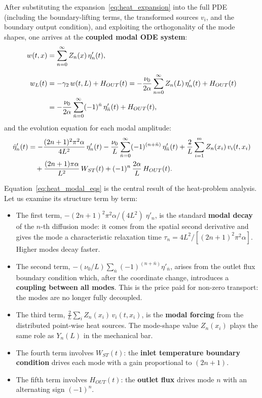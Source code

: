 After substituting the expansion~\eqref{eq:heat_expansion} into
the full PDE (including the boundary-lifting terms, the transformed sources
$v_{i}$, and the boundary output condition), and exploiting the orthogonality
of the mode shapes, one arrives at the \textbf{coupled modal ODE system}:
\begin{align}
  w(t,x) &= \sum_{n=0}^{\infty} Z_{n}(x)\,\eta'_{n}(t),
  \label{eq:heat_w_expansion}\\[6pt]
  w_{L}(t)
  &= -\gamma_{2}\,w(t,L) + H_{OUT}(t)
   = -\frac{\nu_{0}}{2\alpha}\sum_{n=0}^{\infty} Z_{n}(L)\,\eta'_{n}(t)
     + H_{OUT}(t) \notag\\
  &= -\frac{\nu_{0}}{2\alpha}\sum_{\bar{n}=0}^{\infty}(-1)^{\bar{n}}\,\eta'_{\bar{n}}(t)
     + H_{OUT}(t),
  \label{eq:heat_wL}
\end{align}
and the evolution equation for each modal amplitude:
\begin{align}
  \dot{\eta}'_{n}(t)
  &= -\frac{(2n+1)^{2}\pi^{2}\alpha}{4L^{2}}\,\eta'_{n}(t)
     - \frac{\nu_{0}}{L}\sum_{\bar{n}=0}^{\infty}(-1)^{(n+\bar{n})}\,\eta'_{\bar{n}}(t)
     + \frac{2}{L}\sum_{i=1}^{m} Z_{n}(x_{i})\,v_{i}(t,x_{i})
     \notag\\
  &\quad
     + \frac{(2n+1)\pi\alpha}{L^{2}}\,W_{ST}(t)
     + (-1)^{n}\,\frac{2\alpha}{L}\,H_{OUT}(t).
  \label{eq:heat_modal_eqs}
\end{align}

Equation~\eqref{eq:heat_modal_eqs} is the central result of the heat-problem
analysis.  Let us examine its structure term by term:
\begin{itemize}[leftmargin=2em,itemsep=4pt]
  \item The first term, $-(2n+1)^{2}\pi^{2}\alpha/(4L^{2})\;\eta'_{n}$, is the
    standard \textbf{modal decay} of the $n$-th diffusion mode: it comes from the
    spatial second derivative and gives the mode a characteristic relaxation time
    $\tau_{n} = 4L^{2}/[(2n+1)^{2}\pi^{2}\alpha]$.  Higher modes decay faster.
  \item The second term, $-(\nu_{0}/L)\sum_{\bar{n}}(-1)^{(n+\bar{n})}\eta'_{\bar{n}}$,
    arises from the outlet flux boundary condition which, after the coordinate
    change, introduces a \textbf{coupling between all modes}.  This is the
    price paid for non-zero transport: the modes are no longer fully decoupled.
  \item The third term, $\frac{2}{L}\sum_{i} Z_{n}(x_{i})\,v_{i}(t,x_{i})$,
    is the \textbf{modal forcing} from the distributed point-wise heat sources.
    The mode-shape value $Z_{n}(x_{i})$ plays the same role as $Y_{n}(L)$ in
    the mechanical bar.
  \item The fourth term involves $W_{ST}(t)$: the \textbf{inlet temperature
    boundary condition} drives each mode with a gain proportional to $(2n+1)$.
  \item The fifth term involves $H_{OUT}(t)$: the \textbf{outlet flux} drives
    mode $n$ with an alternating sign $(-1)^{n}$.
\end{itemize}

